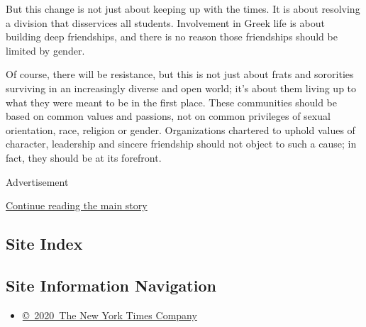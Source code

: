 But this change is not just about keeping up with the times. It is about
resolving a division that disservices all students. Involvement in Greek
life is about building deep friendships, and there is no reason those
friendships should be limited by gender.

Of course, there will be resistance, but this is not just about frats
and sororities surviving in an increasingly diverse and open world; it's
about them living up to what they were meant to be in the first place.
These communities should be based on common values and passions, not on
common privileges of sexual orientation, race, religion or gender.
Organizations chartered to uphold values of character, leadership and
sincere friendship should not object to such a cause; in fact, they
should be at its forefront.

Advertisement

\protect\hyperlink{after-bottom}{Continue reading the main story}

\hypertarget{site-index}{%
\subsection{Site Index}\label{site-index}}

\hypertarget{site-information-navigation}{%
\subsection{Site Information
Navigation}\label{site-information-navigation}}

\begin{itemize}
\tightlist
\item
  \href{https://help.nytimes3xbfgragh.onion/hc/en-us/articles/115014792127-Copyright-notice}{©~2020~The
  New York Times Company}
\end{itemize}

